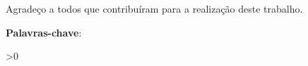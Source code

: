 \documentclass[
    12pt,               %
    oneside,            %
    a4paper,            %
    chapter=TITLE,      %
    section=TITLE,      %
    english,            %
    brazil              %
]{abntex2}
\begin{document}

\frenchspacing


\pretextual

\imprimircapa

\imprimirfolhaderosto

%     

\imprimirfolhadabanca

\begin{agradecimentos}
Agradeço a todos que contribuíram para a realização deste trabalho.

\end{agradecimentos}


\begin{resumo}
    \imprimirresumo
    \par
    \noindent \textbf{Palavras-chave}: \imprimirpalavraschave
\end{resumo}

\ifnum{}>0
    \listoffigures*
    \cleardoublepage
\fi
\end{document}
